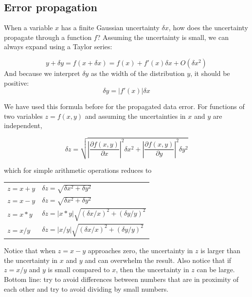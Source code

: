 \documentclass[justified, sixbynine]{tufte-book}
\theoremstyle{plain}%
\newtheorem * {corollary}{Corollary}
\theoremstyle{definition}
\theoremstyle{remark}
\newtheorem * {remark}{Remark}
\newtheorem * {note}{Note}
\begin{document}
\begin{fullwidth}
\goodbreak\subsection{Error propagation}


When a variable $x$ has a finite Gaussian uncertainty $\delta x$, how does the uncertainty propagate through a function $f$? Assuming the uncertainty is small, we can always expand using a Taylor series:

\begin{equation}
y+\delta y = f(x+\delta x) = f(x) + f'(x)\delta x + O(\delta x^2)
\end{equation}
And because we interpret $\delta y$ as the width of the distribution $y$, it should be positive:
\begin{equation}
  \delta y = |f'(x)|\delta x
\end{equation}

We have used this formula before for the propagated data error.
For functions of two variables $z = f(x, y)$ and assuming the uncertainties in $x$ and $y$ are independent, 

\begin{equation}
  \delta z = \sqrt{\left|\frac{\partial f(x, y)}{\partial x}\right|^2\delta x^2 +
\left|\frac{\partial f(x, y)}{\partial y}\right|^2\delta y^2 }
\end{equation}

which for simple arithmetic operations reduces to

\begin{tabular}{ll}
  $z = x + y$ &
  $\delta z = \sqrt{\delta x^2 + \delta y^2 }$ \\
  $z = x - y$ &
  $\delta z = \sqrt{\delta x^2 + \delta y^2 }$ \\
  $z = x * y$ &
  $\delta z = |x * y|\sqrt{(\delta x/x)^2 + (\delta y/y)^2 }$ \\
  $z = x / y$ &
  $\delta z = |x/y|\sqrt{(\delta x/x)^2 + (\delta y/y)^2 }$ \\
\end{tabular}

Notice that when $z=x-y$ approaches zero, the uncertainty in $z$ is larger than the uncertainty in $x$ and $y$ and can overwhelm the result.
Also notice that if $z=x/y$ and $y$ is small compared to $x$, then the uncertainty in $z$ can be large.
Bottom line: try to avoid differences between numbers that are in proximity of each other and try to avoid dividing by small numbers.


\end{fullwidth}
\end{document}
